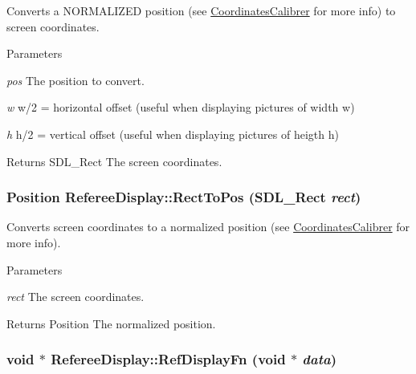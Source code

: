 Converts a NORMALIZED position (see \hyperlink{classCoordinatesCalibrer}{CoordinatesCalibrer} for more info) to screen coordinates. 


\begin{DoxyParams}{Parameters}
\item[{\em pos}]The position to convert. \item[{\em w}]w/2 = horizontal offset (useful when displaying pictures of width w) \item[{\em h}]h/2 = vertical offset (useful when displaying pictures of heigth h) \end{DoxyParams}
\begin{DoxyReturn}{Returns}
SDL\_\-Rect The screen coordinates. 
\end{DoxyReturn}
\hypertarget{classRefereeDisplay_a4abb9b85d92cbdd30fe6fd29a17c3767}{
\subsubsection[{RectToPos}]{\setlength{\rightskip}{0pt plus 5cm}Position RefereeDisplay::RectToPos (SDL\_\-Rect {\em rect})}}
\label{classRefereeDisplay_a4abb9b85d92cbdd30fe6fd29a17c3767}


Converts screen coordinates to a normalized position (see \hyperlink{classCoordinatesCalibrer}{CoordinatesCalibrer} for more info). 


\begin{DoxyParams}{Parameters}
\item[{\em rect}]The screen coordinates. \end{DoxyParams}
\begin{DoxyReturn}{Returns}
Position The normalized position. 
\end{DoxyReturn}
\hypertarget{classRefereeDisplay_a0aecfa7e27f573859a1bb037aca9693a}{
\subsubsection[{RefDisplayFn}]{\setlength{\rightskip}{0pt plus 5cm}void $\ast$ RefereeDisplay::RefDisplayFn (void $\ast$ {\em data})}}
\label{classRefereeDisplay_a0aecfa7e27f573859a1bb037aca9693a}


